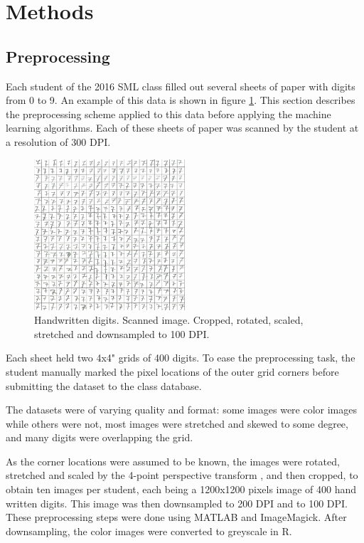 \section{Methods}
\subsection{Preprocessing}
\label{sec:preprocessing}
Each student of the 2016 SML class filled out several sheets of paper
with digits from 0 to 9. An example of this data
is shown in figure 
\ref{fig:handwriten_digits}. 
This section describes the preprocessing scheme
applied to this data before applying the machine learning algorithms.
Each of these sheets of paper was scanned by the student at a resolution of 300 DPI.
\begin{figure}[ht]
\centering
\includegraphics[width = 0.5\textwidth]{img/cropY2016G2M1-100-7.png}
\caption[Handwritten digits]
{
Handwritten digits. Scanned image. Cropped, rotated, scaled, stretched
and downsampled to 100 DPI.
}
\label{fig:handwriten_digits}
\end{figure}

Each sheet held two 4x4" grids of 400 digits.
To ease the preprocessing task,
the student manually marked the pixel locations of the outer grid corners
before submitting the dataset to the class database.

The datasets were of varying quality and format:
some images were color images while others were not,
most images were stretched and skewed to some degree,
and many digits were overlapping the grid.

As the corner locations were assumed to be known,
the images were rotated, stretched and scaled
by the 4-point perspective transform \citep{perspective},
and then cropped,
to obtain ten images per student,
each being a 1200x1200 pixels image of 400 hand written digits.
This image was then downsampled to 200 DPI and to 100 DPI.
These preprocessing steps were done using MATLAB and ImageMagick.
After downsampling, the color images were converted to greyscale in R.

